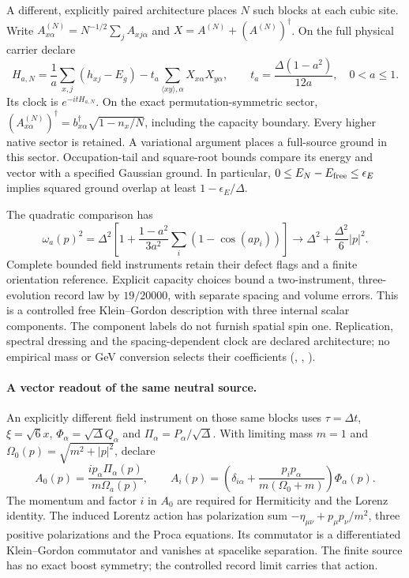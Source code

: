 A different, explicitly paired architecture places $N$ such blocks at
each cubic site. Write $A^{(N)}_{x\alpha}=N^{-1/2}\sum_j A_{xj\alpha}$
and $X=A^{(N)}+(A^{(N)})^\dagger$. On the full physical carrier declare
\[
 H_{a,N}=\frac1a\sum_{x,j}(h_{xj}-E_g)
       -t_a\sum_{\langle xy\rangle,\alpha}X_{x\alpha}X_{y\alpha},
 \qquad t_a=\frac{\Delta(1-a^2)}{12a},\quad 0<a\le1.
\]
Its clock is $e^{-itH_{a,N}}$. On the exact permutation-symmetric
sector, $(A^{(N)}_{x\alpha})^\dagger
=b^\dagger_{x\alpha}\sqrt{1-n_x/N}$, including the capacity boundary.
Every higher native sector is retained. A variational argument places a
full-source ground in this sector. Occupation-tail and square-root
bounds compare its energy and vector with a specified Gaussian ground.
In particular, $0\le E_N-E_{\rm free}\le\epsilon_E$ implies squared
ground overlap at least $1-\epsilon_E/\Delta$.

The quadratic comparison has
\[
 \omega_a(p)^2=\Delta^2\left[1+
 \frac{1-a^2}{3a^2}\sum_i(1-\cos(ap_i))\right]
 \longrightarrow \Delta^2+\frac{\Delta^2}{6}|p|^2.
\]
Complete bounded field instruments retain their defect flags and a
finite orientation reference. Explicit capacity choices bound a
two-instrument, three-evolution record law by $19/20000$, with separate
spacing and volume errors. This is a controlled free Klein--Gordon
description with three internal scalar components. The component labels
do not furnish spatial spin one. Replication, spectral dressing and the
spacing-dependent clock are declared architecture; no empirical mass
or GeV conversion selects their coefficients
(,
, \cite{ophrepo}).

\paragraph{A vector readout of the same neutral source.}
An explicitly different field instrument on those same blocks uses
$\tau=\Delta t$, $\xi=\sqrt6x$, $\Phi_\alpha=\sqrt\Delta Q_\alpha$ and
$\Pi_\alpha=P_\alpha/\sqrt\Delta$. With limiting mass $m=1$ and
$\Omega_0(p)=\sqrt{m^2+|p|^2}$, declare
\[
 A_0(p)=\frac{i p_\alpha\Pi_\alpha(p)}{m\Omega_a(p)},\qquad
 A_i(p)=\left(\delta_{i\alpha}+
 \frac{p_ip_\alpha}{m(\Omega_0+m)}\right)\Phi_\alpha(p).
\]
The momentum and factor $i$ in $A_0$ are required for Hermiticity and the
Lorenz identity. The induced Lorentz action has polarization sum
$-\eta_{\mu\nu}+p_\mu p_\nu/m^2$, three positive polarizations and the
Proca equations. Its commutator is a differentiated Klein--Gordon
commutator and vanishes at spacelike separation. The finite source has
no exact boost symmetry; the controlled record limit carries that action.


